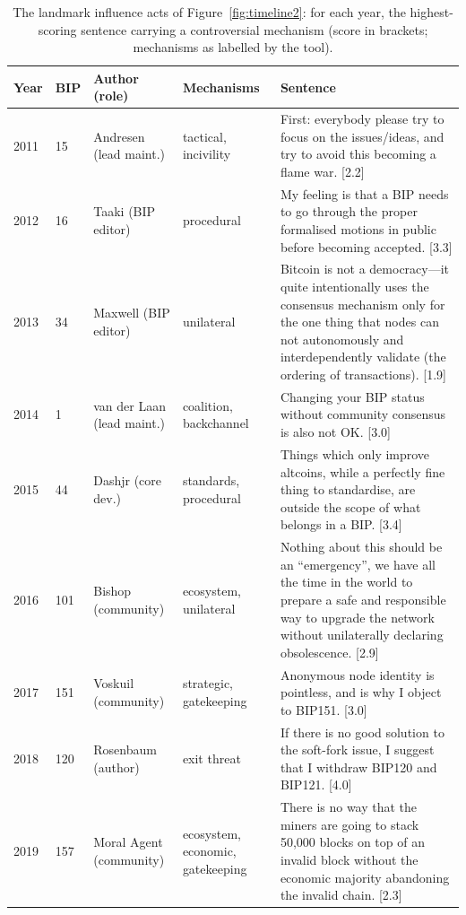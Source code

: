\begin{table}[t]
\caption{The landmark influence acts of Figure~\ref{fig:timeline2}: for each year, the highest-scoring sentence carrying a controversial mechanism (score in brackets; mechanisms as labelled by the tool).}
\label{tab:landmarks}
\footnotesize
\begin{tabular}{p{}p{}p{}p{}p{}}
\toprule
Year & BIP & Author (role) & Mechanisms & Sentence \\
\midrule
2011 & 15 & Andresen (lead maint.) & tactical, incivility & First: everybody please try to focus on the issues/ideas, and try to avoid this becoming a flame war. [2.2] \\
2012 & 16 & Taaki (BIP editor) & procedural & My feeling is that a BIP needs to go through the proper formalised motions in public before becoming accepted. [3.3] \\
2013 & 34 & Maxwell (BIP editor) & unilateral & Bitcoin is not a democracy---it quite intentionally uses the consensus mechanism only for the one thing that nodes can not autonomously and interdependently validate (the ordering of transactions). [1.9] \\
2014 & 1 & van der Laan (lead maint.) & coalition, backchannel & Changing your BIP status without community consensus is also not OK. [3.0] \\
2015 & 44 & Dashjr (core dev.) & standards, procedural & Things which only improve altcoins, while a perfectly fine thing to standardise, are outside the scope of what belongs in a BIP. [3.4] \\
2016 & 101 & Bishop (community) & ecosystem, unilateral & Nothing about this should be an ``emergency'', we have all the time in the world to prepare a safe and responsible way to upgrade the network without unilaterally declaring obsolescence. [2.9] \\
2017 & 151 & Voskuil (community) & strategic, gatekeeping & Anonymous node identity is pointless, and is why I object to BIP151. [3.0] \\
2018 & 120 & Rosenbaum (author) & exit threat & If there is no good solution to the soft-fork issue, I suggest that I withdraw BIP120 and BIP121. [4.0] \\
2019 & 157 & Moral Agent (community) & ecosystem, economic, gatekeeping & There is no way that the miners are going to stack 50,000 blocks on top of an invalid block without the economic majority abandoning the invalid chain. [2.3] \\

\end{tabular}
\end{table}
